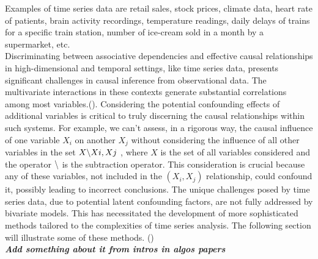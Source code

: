 Examples of time series data are retail sales, stock prices, climate data, heart rate of patients, brain activity recordings, temperature readings, daily delays of trains for a specific train station, number of ice-cream sold in a month by a supermarket, etc.\\

Discriminating between associative dependencies and effective causal relationships in high-dimensional and temporal settings, like time series data, presents significant challenges in causal inference from observational data. The multivariate interactions in these contexts generate substantial correlations among most variables.(\cite{bontempi2020learning}). 
Considering the potential confounding effects of additional variables is critical to truly discerning the causal relationships within such systems. For example, we can't assess, in a rigorous way, the causal influence of one variable $X_{i}$ on another $X_{j}$ without considering the influence of all other variables in the set $X \symbol{92} {Xi, Xj}$ , where $X$ is the set of all variables considered and the operator $\symbol{92}$ is the subtraction operator. This consideration is crucial because any of these variables, not included in the $(X_i,X_j)$ relationship, could confound it, possibly leading to incorrect conclusions. The unique challenges posed by time series data, due to potential latent confounding factors, are not fully addressed by bivariate models. This has necessitated the development of more sophisticated methods tailored to the complexities of time series analysis. The following section will illustrate some of these methods. (\cite{last paper on TD2C})\\

\textit{\textbf{Add something about it from intros in algos papers}}\\

